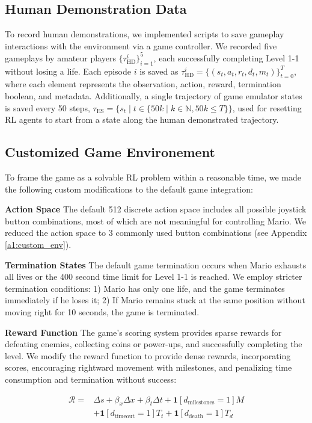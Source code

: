 \documentclass{article}
\begin{document}
\subsection{Human Demonstration Data}
\label{sec:hd_data}
To record human demonstrations, we implemented scripts to save gameplay 
interactions with the environment via a game controller. 
We recorded five gameplays by amateur players $\{\tau_{\text{HD}}^{i}\}_{i=1}^{5}$, 
each successfully completing Level 1-1 without losing a life.
Each episode $i$ is 
saved as $\tau_{\text{HD}}^{i} = \{(s_t, a_t, r_t, d_t, m_t)\}_{t=0}^{T}$, where each 
element represents the observation, action, reward, termination boolean, and 
metadata.  
Additionally, a single trajectory 
of game emulator states is saved every 50 steps, 
$\tau_{\text{ES}} = \{ s_t \mid t \in \{ 50k \mid k\in \mathbb{N}, 50k \leq T \} \}$,
used for resetting RL agents 
to start from a state along the human demonstrated trajectory.

\subsection{Customized Game Environement}

To frame the game as a solvable RL problem within a reasonable time, we made 
the following custom modifications to the default game integration:

\textbf{Action Space} 
The default 512 discrete action space includes all possible joystick button 
combinations, most of which are not meaningful for controlling Mario. We 
reduced the action space to 3 commonly used button combinations (see 
Appendix \ref{a1:custom_env}).

\textbf{Termination States}
The default game termination occurs when Mario exhausts all lives or the 400 
second time limit for Level 1-1 is reached. We employ stricter termination 
conditions: 1) Mario has only one life, and the game terminates immediately if 
he loses it; 2) If Mario remains stuck at the same position without moving 
right for 10 seconds, the game is terminated.

\textbf{Reward Function}
The game's scoring system provides sparse rewards for defeating enemies, 
collecting coins or power-ups, and successfully completing the level.
We modify the reward function to provide dense rewards, incorporating scores, 
encouraging rightward movement with milestones, and penalizing time consumption 
and termination without success:

\begin{align*}
      \mathcal{R} = &\Delta s + \beta_x \Delta x + \beta_t \Delta t + \mathbf{1}[d_{\text{milestones}} = 1] M\\
      & + \mathbf{1}[d_{\text{timeout}} = 1] T_t + \mathbf{1}[d_{\text{death}} = 1] T_d
\end{align*}
\end{document}
